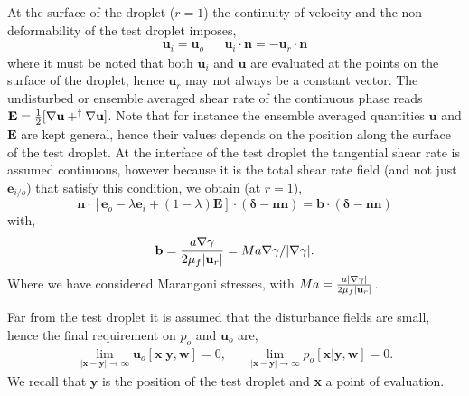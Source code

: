 At the surface of the droplet ($r = 1$) the continuity of velocity and the non-deformability of the test droplet imposes, 
\begin{align}
    \textbf{u}_{i} = \textbf{u}_{o}
    && 
    \textbf{u}_{i} \cdot \textbf{n}
    =
    - \textbf{u}_r \cdot \textbf{n}
    \label{eq:normal_vel}
\end{align}
where it must be noted that both $\textbf{u}_{i}$ and $\textbf{u}$ are evaluated at the points on the surface of the droplet, hence $\textbf{u}_r$ may not always be a constant vector. 
The undisturbed or ensemble averaged shear rate of the continuous phase reads  $\textbf{E} =\frac{1}{2} [\mathbf{\nabla} \textbf{u} + ^\dagger \mathbf{\nabla} \textbf{u}]$. 
Note that for instance the ensemble averaged quantities $\textbf{u}$ and $\textbf{E}$ are kept general, hence their values depends on the position along the surface of the test droplet. 
At the interface of the test droplet the tangential shear rate is assumed continuous, however because it is the total shear rate field (and not just $\textbf{e}_{i/o}$) that satisfy this condition, we obtain (at $r=1$),
\begin{equation}
    \mathbf{n}\cdot [\textbf{e}_{o} - \lambda \textbf{e}_{i} + (1-\lambda)\textbf{E}
    ]\cdot (\bm\delta - \textbf{nn})
    =
    \textbf{b}\cdot (\bm\delta - \textbf{nn})
    \label{eq:boundary_cdt_stress}
\end{equation}
with, 
\begin{equation}
    \textbf{b}
    =
    \frac{a \mathbf{\nabla} \gamma}{2 \mu_f |\textbf{u}_r|}
    = Ma \mathbf{\nabla}\gamma /|\mathbf{\nabla} \gamma|. 
\end{equation}
Where we have considered Marangoni stresses, with $Ma = \frac{a |\mathbf{\nabla} \gamma|}{2 \mu_f |\textbf{u}_r|}$. 



Far from the test droplet it is assumed that the disturbance fields are small, hence the final requirement on $p_{o}$ and $\textbf{u}_{o}$ are, 
\begin{align*}
    \lim_{|\textbf{x}-\textbf{y}|\to\infty }\textbf{u}_{o}[\textbf{x}|\textbf{y},\textbf{w}] = 0,
    && \lim_{|\textbf{x}-\textbf{y}|\to\infty }p_{o}[\textbf{x}|\textbf{y},\textbf{w}]= 0. 
\end{align*}
We recall that $\textbf{y}$ is the position of the test droplet and \textbf{x} a point of evaluation. 






